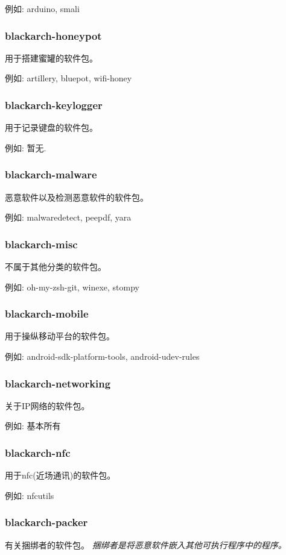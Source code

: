 \documentclass[a4paper, oneside, 11pt]{book}
\begin{document}
例如: arduino, smali

\subsubsection{blackarch-honeypot}
用于搭建蜜罐的软件包。

例如: artillery, bluepot, wifi-honey

\subsubsection{blackarch-keylogger}
用于记录键盘的软件包。

例如: 暂无.

\subsubsection{blackarch-malware}
恶意软件以及检测恶意软件的软件包。

例如: malwaredetect, peepdf, yara

\subsubsection{blackarch-misc}
不属于其他分类的软件包。

例如: oh-my-zsh-git, winexe, stompy

\subsubsection{blackarch-mobile}
用于操纵移动平台的软件包。

例如: android-sdk-platform-tools, android-udev-rules

\subsubsection{blackarch-networking}
关于IP网络的软件包。

例如: 基本所有

\subsubsection{blackarch-nfc}
用于nfc(近场通讯)的软件包。

例如: nfcutils

\subsubsection{blackarch-packer}
有关捆绑者的软件包。
\textit{捆绑者是将恶意软件嵌入其他可执行程序中的程序。}
\end{document}

